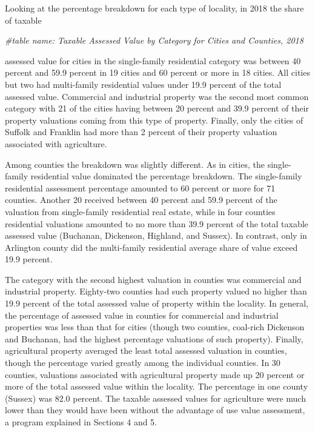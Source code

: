 \documentclass[
]{book}
\newenvironment{Shaded}{\begin{snugshade}}{\end{snugshade}}
\newcommand{\CommentTok}[1]{\textcolor[rgb]{0.56,0.35,0.01}{\textit{#1}}}
\begin{document}
Looking at the percentage breakdown for each type of locality, in 2018 the share of taxable

\begin{Shaded}
\begin{Highlighting}[]
\CommentTok{\#table name: Taxable Assessed Value by Category for Cities and Counties, 2018}
\end{Highlighting}
\end{Shaded}

assessed value for cities in the single-family residential category was between 40 percent and 59.9 percent in 19 cities and 60 percent or more in 18 cities. All cities but two had multi-family residential values under 19.9 percent of the total assessed value. Commercial and industrial property was the second most common category with 21 of the cities having between 20 percent and 39.9 percent of their property valuations coming from this type of property. Finally, only the cities of Suffolk and Franklin had more than 2 percent of their property valuation associated with agriculture.

Among counties the breakdown was slightly different. As in cities, the single-family residential value dominated the percentage breakdown. The single-family residential assessment percentage amounted to 60 percent or more for 71 counties. Another 20 received between 40 percent and 59.9 percent of the valuation from single-family residential real estate, while in four counties residential valuations amounted to no more than 39.9 percent of the total taxable assessed value (Buchanan, Dickenson, Highland, and Sussex). In contrast, only in Arlington county did the multi-family residential average share of value exceed 19.9 percent.

The category with the second highest valuation in counties was commercial and industrial property. Eighty-two counties had such property valued no higher than 19.9 percent of the total assessed value of property within the locality. In general, the percentage of assessed value in counties for commercial and industrial properties was less than that for cities (though two counties, coal-rich Dickenson and Buchanan, had the highest percentage valuations of such property). Finally, agricultural property averaged the least total assessed valuation in counties, though the percentage varied greatly among the individual counties. In 30 counties, valuations associated with agricultural property made up 20 percent or more of the total assessed value within the locality. The percentage in one county (Sussex) was 82.0 percent. The taxable assessed values for agriculture were much lower than they would have been without the advantage of use value assessment, a program explained in Sections 4 and 5.
\end{document}

